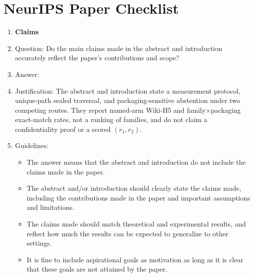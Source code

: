 
\section*{NeurIPS Paper Checklist}

\begin{enumerate}

\item {\bf Claims}
\item[] Question: Do the main claims made in the abstract and introduction accurately reflect the paper's contributions and scope?
\item[] Answer: \answerYes{}
\item[] Justification: The abstract and introduction state a measurement protocol, unique-path sealed traversal, and packaging-sensitive abstention under two competing routes. They report named-arm Wiki-H5 and family$\times$packaging exact-match rates, not a ranking of families, and do not claim a confidentiality proof or a scored $(r_1,r_2)$.
\item[] Guidelines:
\begin{itemize}
\item The answer \answerNA{} means that the abstract and introduction do not include the claims made in the paper.
\item The abstract and/or introduction should clearly state the claims made, including the contributions made in the paper and important assumptions and limitations.
\item The claims made should match theoretical and experimental results, and reflect how much the results can be expected to generalize to other settings.
\item It is fine to include aspirational goals as motivation as long as it is clear that these goals are not attained by the paper.
\end{itemize}


\end{enumerate}
